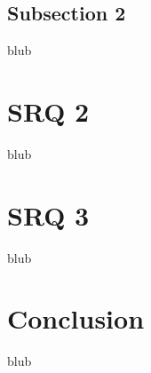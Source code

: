 \subsection{Subsection 2}

blub



\section{SRQ 2}

\label{SectionLiteratureReviewSRQ2}

blub




\section{SRQ 3}

\label{SectionLiteratureReviewSRQ3}

blub





\section{Conclusion}

\label{SectionLiteratureReviewConclusion}

blub


